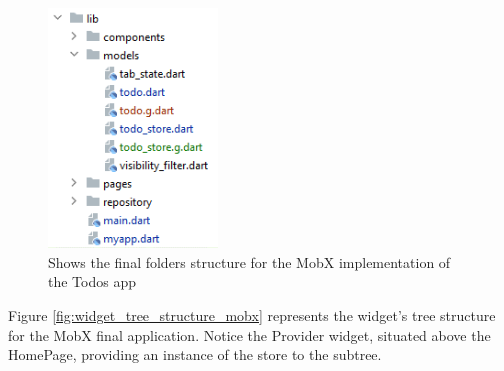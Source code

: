 \begin{figure}[H]
    \centering
    \includegraphics[width=0.4\textwidth]{Images/struttura_cartelle_mobx.png}
    \caption{Shows the final folders structure for the MobX implementation of the Todos app}
    \label{fig:struttura_cartelle_mobx}
\end{figure}
Figure \ref{fig:widget_tree_structure_mobx} represents the widget's tree structure for the MobX final application. Notice the Provider widget, situated above the HomePage, providing an instance of the store to the subtree.

